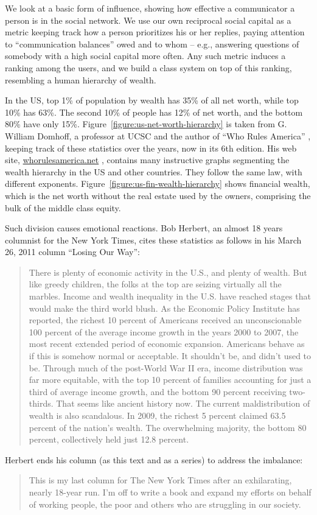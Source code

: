 \documentclass[10pt,oneside]{memoir}
\begin{document}
\begin{Spacing}{2}
We look at a basic form of influence, showing how effective a communicator a person is in the social network.  We use our own reciprocal social capital as a metric keeping track how a person prioritizes his or her replies, paying attention to ``communication balances'' owed and to whom -- e.g., answering questions of somebody with a high social capital more often.  Any such metric induces a ranking among the users, and we build a class system on top of this ranking, resembling a human hierarchy of wealth.


In the US, top 1\% of population by wealth has 35\% of all net worth, while top 10\% has 63\%.  The second 10\% of people has 12\% of net worth, and the bottom 80\% have only 15\%.  Figure~\ref{figure:us-net-worth-hierarchy} is taken from  G. William Domhoff, a professor at UCSC and the author of ``Who Rules America'' \cite{domhoff2006rules}, keeping track of these statistics over the years, now in its 6th edition.  His web site, \url{whorulesamerica.net} \cite{domhoff2011whorules}, contains many instructive graphs segmenting the wealth hierarchy in the US and other countries.  They follow the same law, with different exponents.  Figure~\ref{figure:us-fin-wealth-hierarchy} shows financial wealth, which is the net worth without the real estate used by the owners, comprising the bulk of the middle class equity.


Such division causes emotional reactions.  Bob Herbert, an almost 18 years columnist for the New York Times, cites these statistics as follows in his March 26, 2011 column ``Losing Our Way'':


\begin{quote}
There is plenty of economic activity in the U.S., and plenty of wealth. But like greedy children, the folks at the top are seizing virtually all the marbles. Income and wealth inequality in the U.S. have reached stages that would make the third world blush. As the Economic Policy Institute has reported, the richest 10 percent of Americans received an unconscionable 100 percent of the average income growth in the years 2000 to 2007, the most recent extended period of economic expansion.
Americans behave as if this is somehow normal or acceptable. It shouldn't be, and didn't used to be. Through much of the post-World War II era, income distribution was far more equitable, with the top 10 percent of families accounting for just a third of average income growth, and the bottom 90 percent receiving two-thirds. That seems like ancient history now.
The current maldistribution of wealth is also scandalous. In 2009, the richest 5 percent claimed 63.5 percent of the nation's wealth. The overwhelming majority, the bottom 80 percent, collectively held just 12.8 percent.
\end{quote}
Herbert ends his column (as this text and as a series) to address the imbalance:
\begin{quote}
This is my last column for The New York Times after an exhilarating, nearly 18-year run. I'm off to write a book and expand my efforts on behalf of working people, the poor and others who are struggling in our society.
\end{quote}



\end{Spacing}
\end{document}
